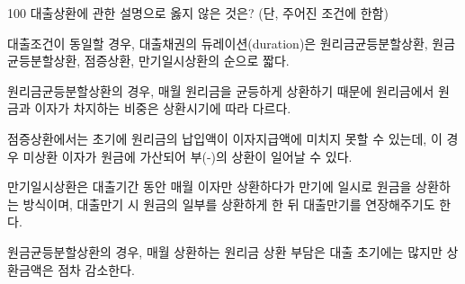\begin{question}{100}
대출상환에 관한 설명으로 옳지 않은 것은? (단, 주어진 조건에 한함)
\begin{choices}
  \item 대출조건이 동일할 경우, 대출채권의 듀레이션(duration)은 원리금균등분할상환, 원금균등분할상환, 점증상환, 만기일시상환의 순으로 짧다.
  \item 원리금균등분할상환의 경우, 매월 원리금을 균등하게 상환하기 때문에 원리금에서 원금과 이자가 차지하는 비중은 상환시기에 따라 다르다.
  \item 점증상환에서는 초기에 원리금의 납입액이 이자지급액에 미치지 못할 수 있는데, 이 경우 미상환 이자가 원금에 가산되어 부(-)의 상환이 일어날 수 있다.
  \item 만기일시상환은 대출기간 동안 매월 이자만 상환하다가 만기에 일시로 원금을 상환하는 방식이며, 대출만기 시 원금의 일부를 상환하게 한 뒤 대출만기를 연장해주기도 한다.
  \item 원금균등분할상환의 경우, 매월 상환하는 원리금 상환 부담은 대출 초기에는 많지만 상환금액은 점차 감소한다.
\end{choices}
\end{question}
